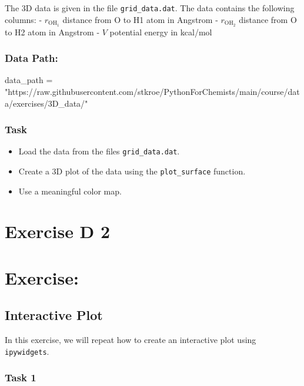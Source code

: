 \documentclass[
  letterpaper,
  DIV=11,
  numbers=noendperiod]{scrreprt}
\newenvironment{Shaded}{\begin{snugshade}}{\end{snugshade}}
\newcommand{\NormalTok}[1]{\textcolor[rgb]{0.00,0.23,0.31}{#1}}
\newcommand{\OperatorTok}[1]{\textcolor[rgb]{0.37,0.37,0.37}{#1}}
\newcommand{\StringTok}[1]{\textcolor[rgb]{0.13,0.47,0.30}{#1}}
\providecommand{\tightlist}{%
  \setlength{\itemsep}{0pt}\setlength{\parskip}{0pt}}\usepackage{longtable,booktabs,array}
\begin{document}
The 3D data is given in the file \texttt{grid\_data.dat}. The data
contains the following columns: - \(r_\mathrm{OH_1}\) distance from O to
H1 atom in Angstrom - \(r_\mathrm{OH_2}\) distance from O to H2 atom in
Angstrom - \(V\) potential energy in kcal/mol

\subsection{Data Path:}\label{data-path-4}

\begin{Shaded}
\begin{Highlighting}[]
\NormalTok{data\_path }\OperatorTok{=} \StringTok{"https://raw.githubusercontent.com/stkroe/PythonForChemists/main/course/data/exercises/3D\_data/"}
\end{Highlighting}
\end{Shaded}

\subsection{Task}\label{task-5}

\begin{itemize}
\tightlist
\item
  Load the data from the files \texttt{grid\_data.dat}.
\item
  Create a 3D plot of the data using the \texttt{plot\_surface}
  function.
\item
  Use a meaningful color map.
\end{itemize}

\chapter{Exercise D 2}\label{exercise-d-2}

\chapter{Exercise:}\label{exercise-5}

\section{Interactive Plot}\label{interactive-plot}

In this exercise, we will repeat how to create an interactive plot using
\texttt{ipywidgets}.

\subsection{Task 1}\label{task-1-1}
\end{document}
